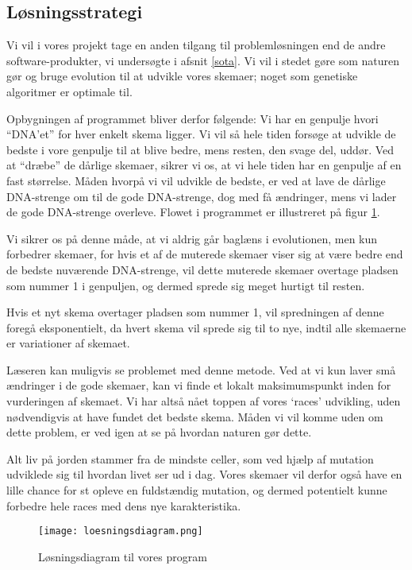 \subsection{Løsningsstrategi}
Vi vil i vores projekt tage en anden tilgang til problemløsningen end de andre software-produkter, vi undersøgte i afsnit \ref{sota}. Vi vil i stedet gøre som naturen gør og bruge evolution til at udvikle vores skemaer; noget som genetiske algoritmer er optimale til.

Opbygningen af programmet bliver derfor følgende: Vi har en genpulje hvori ``DNA'et'' for hver enkelt skema ligger. Vi vil så hele tiden forsøge at udvikle de bedste i vore genpulje til at blive bedre, mens resten, den svage del, uddør. Ved at ``dræbe'' de dårlige skemaer, sikrer vi os, at vi hele tiden har en genpulje af en fast størrelse. Måden hvorpå vi vil udvikle de bedste, er ved at lave de dårlige DNA-strenge om til de gode DNA-strenge, dog med få ændringer, mens vi lader de gode DNA-strenge overleve. Flowet i programmet er illustreret på figur \ref{fig:loesningsdiagram}.

Vi sikrer os på denne måde, at vi aldrig går baglæns i evolutionen, men kun forbedrer skemaer, for hvis et af de muterede skemaer viser sig at være bedre end de bedste nuværende DNA-strenge, vil dette muterede skemaer overtage pladsen som nummer 1 i genpuljen, og dermed sprede sig meget hurtigt til resten.

Hvis et nyt skema overtager pladsen som nummer 1, vil spredningen af denne foregå eksponentielt, da hvert skema vil sprede sig til to nye, indtil alle skemaerne er variationer af skemaet.

Læseren kan muligvis se problemet med denne metode. Ved at vi kun laver små ændringer i de gode skemaer, kan vi finde et lokalt maksimumspunkt inden for vurderingen af skemaet. Vi har altså nået toppen af vores `races' udvikling, uden nødvendigvis at have fundet det bedste skema. Måden vi vil komme uden om dette problem, er ved igen at se på hvordan naturen gør dette.

Alt liv på jorden stammer fra de mindste celler, som ved hjælp af mutation udviklede sig til hvordan livet ser ud i dag. Vores skemaer vil derfor også have en lille chance for st opleve en fuldstændig mutation, og dermed potentielt kunne forbedre hele races med dens nye karakteristika.

\begin{figure}[h!]
	\centering
	\texttt{[image: loesningsdiagram.png]}
	\caption{Løsningsdiagram til vores program}
	\label{fig:loesningsdiagram}
\end{figure}